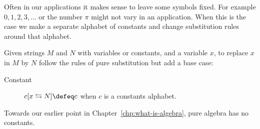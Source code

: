 Often in our applications it makes sense to leave some symbols fixed.
For example $0,1,2,3,\ldots$ or the number $\pi$ might not vary in an application.
When this is the case we make a separate alphabet of constants and change substitution 
rules around that alphabet.
\begin{definition}
    Given strings $M$ and $N$ with variables or constants, 
    and a variable $x$, to replace $x$ in $M$ by $N$ 
    follow the rules of pure substitution but add a  base case:
    \begin{description}
        \item[Constant] $c[x\leftrightarrows N]\defeq c$ when $c$ is a constants alphabet. 
    \end{description}
\end{definition}

Towards our earlier point in Chapter~\ref{chp:what-is-algebra}, pure algebra has no constants.

